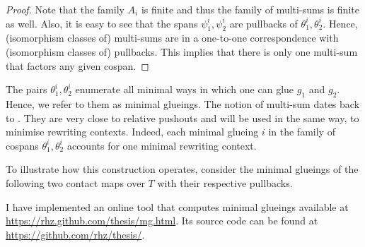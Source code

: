 \begin{proof}
  Note that the family $A_i$ is finite
  and thus the family of multi-sums is finite as well.
  Also, it is easy to see that the spans $\psi^i_1,\psi^i_2$
  are pullbacks of $\theta^i_1,\theta^i_2$.
  Hence, (isomorphism classes of) multi-sums
  are in a one-to-one correspondence
  with (isomorphism classes of) pullbacks.
  This implies that there is only one multi-sum
  that factors any given cospan.
\end{proof}

The pairs $\theta^i_1,\theta^i_2$ enumerate
all minimal ways in which one can glue $g_1$ and $g_2$.
Hence, we refer to them as minimal glueings.
%
The notion of multi-sum dates back to \citet{diers}.
They are very close to relative pushouts \citep{leifer}
and will be used in the same way,
to minimise rewriting contexts.
Indeed, each minimal glueing $i$
in the family of cospans $\theta^i_1,\theta^i_2$
accounts for one minimal rewriting context.

To illustrate how this construction operates,
consider the minimal glueings of the following
two contact maps over $T$ %
with their respective pullbacks.


I have implemented an online tool that computes minimal glueings
available at \url{https://rhz.github.com/thesis/mg.html}.
Its source code can be found at \url{https://github.com/rhz/thesis/}.

